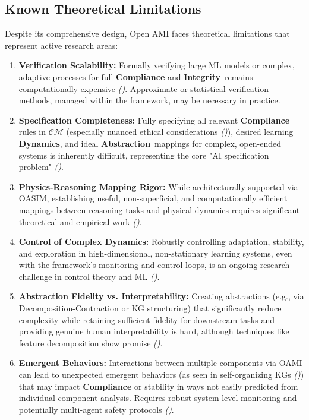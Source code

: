 \documentclass[12pt,a4paper]{report}
\renewcommand{\citep}[1]{\textit{\scriptsize{(\cite{#1})}}}
\newcommand{\Integrity}{\textbf{Integrity}}
\newcommand{\Abstraction}{\textbf{Abstraction}}
\newcommand{\Dynamics}{\textbf{Dynamics}}
\begin{document}
	\subsection{Known Theoretical Limitations}
	\label{sec:2-12-2}
	
	Despite its comprehensive design, Open AMI faces theoretical limitations that represent active research areas:
	
	\begin{enumerate}
		\item \textbf{Verification Scalability:} Formally verifying large ML models or complex, adaptive processes for full \textbf{Compliance} and \Integrity\ remains computationally expensive \citep{Peng2025ZKMLSurvey}. Approximate or statistical verification methods, managed within the framework, may be necessary in practice.
		\item \textbf{Specification Completeness:} Fully specifying all relevant \textbf{Compliance} rules in $\mathcal{CM}$ (especially nuanced ethical considerations \citep{Sekrst2024Guardrails}), desired learning \Dynamics, and ideal \Abstraction\ mappings for complex, open-ended systems is inherently difficult, representing the core "AI specification problem" \citep{Kovac2025SpecGaming}.
		\item \textbf{Physics-Reasoning Mapping Rigor:} While architecturally supported via OASIM, establishing useful, non-superficial, and computationally efficient mappings between reasoning tasks and physical dynamics requires significant theoretical and empirical work \citep{Physics-InspiredReasoning_Ref11}.
		\item \textbf{Control of Complex Dynamics:} Robustly controlling adaptation, stability, and exploration in high-dimensional, non-stationary learning systems, even with the framework's monitoring and control loops, is an ongoing research challenge in control theory and ML \citep{Wang2024ContinualLearningSurvey}.
		\item \textbf{Abstraction Fidelity vs. Interpretability:} Creating abstractions (e.g., via Decomposition-Contraction or KG structuring) that significantly reduce complexity while retaining sufficient fidelity for downstream tasks and providing genuine human interpretability is hard, although techniques like feature decomposition show promise \citep{Anthropic_Decompose_2023}.
		\item \textbf{Emergent Behaviors:} Interactions between multiple components via OAMI can lead to unexpected emergent behaviors (as seen in self-organizing KGs \citep{Buehler2025AgenticGraphRef}) that may impact \textbf{Compliance} or stability in ways not easily predicted from individual component analysis. Requires robust system-level monitoring and potentially multi-agent safety protocols \citep{DoriHacohen2025Misalignment}.

\end{enumerate}
\end{document}
